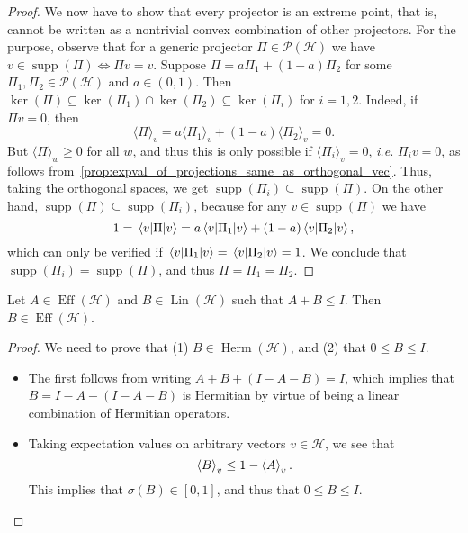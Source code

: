 \documentclass[12pt]{report}
\newcommand{\on}[1]{\operatorname{#1}}
\newcommand{\calH}{{\mathcal{H}}}
\newcommand{\calP}{{\mathcal{P}}}
\DeclareMathOperator{\Herm}{Herm}
\DeclareMathOperator{\Lin}{Lin}
\begin{document}
\begin{proof}
	We now have to show that every projector is an extreme point, that is, cannot be written as a nontrivial convex combination of other projectors.
	For the purpose, observe that for a generic projector $\Pi\in\calP(\calH)$ we have $v\in\on{supp}(\Pi)\Longleftrightarrow \Pi v=v$.
	Suppose $\Pi=a\Pi_1+(1-a)\Pi_2$ for some $\Pi_1,\Pi_2\in\calP(\calH)$ and $a\in(0,1)$.
	Then $\ker(\Pi)\subseteq\ker(\Pi_1)\cap\ker(\Pi_2)\subseteq\ker(\Pi_i)$ for $i=1,2$.
	Indeed, if $\Pi v=0$, then
	\begin{equation}
		\langle \Pi\rangle_v=
		a \langle \Pi_1\rangle_v + (1-a) \langle \Pi_2\rangle_v = 0.
	\end{equation}
	But $\langle \Pi\rangle_w\ge0$ for all $w$, and thus this is only possible if $\langle \Pi_i\rangle_v=0$,
	\emph{i.e.} $\Pi_i v=0$, as follows from~\cref{prop:expval_of_projections_same_as_orthogonal_vec}.
	Thus, taking the orthogonal spaces, we get $\on{supp}(\Pi_i)\subseteq\on{supp}(\Pi)$.
	On the other hand, $\on{supp}(\Pi)\subseteq\on{supp}(\Pi_i)$, because for any $v\in\on{supp}(\Pi)$ we have
	\begin{equation}
		1 = \mel{v}{\Pi}{v}
		= a\mel{v}{\Pi_1}{v} + (1-a) \mel{v}{\Pi_2}{v},
	\end{equation}
	which can only be verified if $\mel{v}{\Pi_1}{v}=\mel{v}{\Pi_2}{v}=1$.
	We conclude that $\on{supp}(\Pi_i)=\on{supp}(\Pi)$, and thus $\Pi=\Pi_1=\Pi_2$.
\end{proof}

\begin{prop}
	Let $A\in\on{Eff}(\calH)$ and $B\in\Lin(\calH)$ such that $A+B\le I$.
	Then $B\in\on{Eff}(\calH)$.
\end{prop}
\begin{proof}
	We need to prove that (1) $B\in\Herm(\calH)$, and (2) that $0\le B\le I$.
	\begin{itemize}
		\item The first follows from writing $A+B+(I-A-B)=I$, which implies that $B=I - A - (I-A-B)$ is Hermitian by virtue of being a linear combination of Hermitian operators.
		\item Taking expectation values on arbitrary vectors $v\in\calH$, we see that
		\begin{equation}
			\expval{B}_v \le 1 - \expval{A}_v.
		\end{equation}
		This implies that $\sigma(B)\in[0,1]$, and thus that $0\le B\le I$.
	\end{itemize}
\end{proof}
\end{document}
